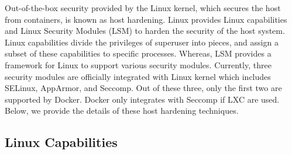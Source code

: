 Out-of-the-box security provided by the Linux kernel, which secures the
host from containers, is known as host hardening.
Linux provides Linux capabilities and Linux Security Modules (LSM)
to harden the security of the host system. Linux capabilities divide
the privileges of superuser into pieces, and assign a subset of these
capabilities to specific processes. Whereas, LSM provides a framework
for Linux to support various security modules. Currently, three security
modules are officially integrated with Linux kernel which includes SELinux,
AppArmor, and Seccomp. Out of these three, only the first two are
supported by Docker. Docker only integrates with Seccomp if LXC are used.
Below, we provide the details of these host hardening techniques.
\addtocounter{table}{-1}
\subsection{Linux Capabilities}

